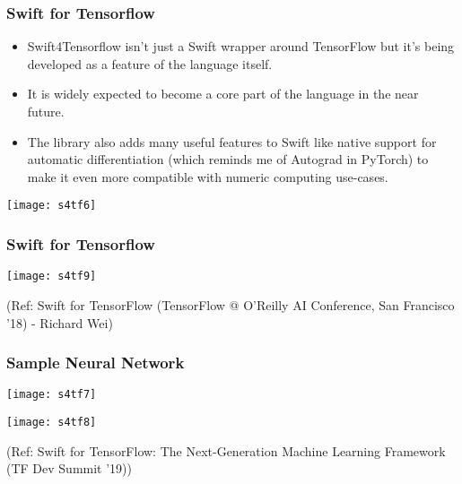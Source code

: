 \begin{frame}[fragile] \frametitle{Swift for Tensorflow}

\begin{itemize}
\item Swift4Tensorflow isn’t just a Swift wrapper around TensorFlow but it’s being developed as a feature of the language itself. 
\item It is widely expected to become a core part of the language in the near future.
\item The library also adds many useful features to Swift like native support for automatic differentiation (which reminds me of Autograd in PyTorch) to make it even more compatible with numeric computing use-cases.
\end{itemize}

\begin{center}
\texttt{[image: s4tf6]}
\end{center}
\end{frame}

\begin{frame}[fragile] \frametitle{Swift for Tensorflow}

\begin{center}
\texttt{[image: s4tf9]}
\end{center}

{\tiny (Ref: Swift for TensorFlow (TensorFlow @ O’Reilly AI Conference, San Francisco '18) - Richard Wei)}
\end{frame}


\begin{frame}[fragile] \frametitle{Sample Neural Network}

\begin{center}
\texttt{[image: s4tf7]}

\texttt{[image: s4tf8]}
\end{center}

{\tiny (Ref: Swift for TensorFlow: The Next-Generation Machine Learning Framework (TF Dev Summit '19))}
\end{frame}

